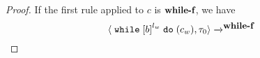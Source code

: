 \begin{proof}
  If the first rule applied to $c$ is $\textbf{\small{while-f}}$, we have
  \[
    \config{{\ewhile \clabel{b}^{l_w} \edo (c_w), \trace_0}}
    \xrightarrow{}^\rname{while-f}
\]
\end{proof}

